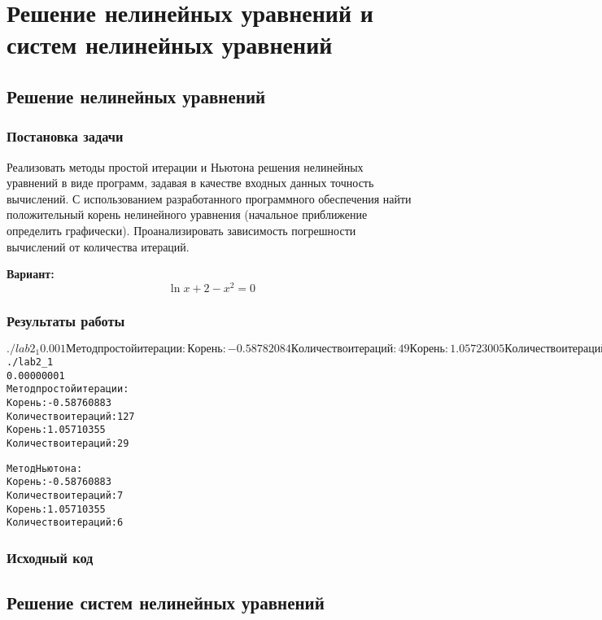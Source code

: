 \section{Решение нелинейных уравнений и систем нелинейных уравнений}

\subsection{Решение нелинейных уравнений}

\subsubsection{Постановка задачи}
Реализовать методы простой итерации и Ньютона решения нелинейных уравнений в виде программ, задавая в качестве входных данных точность вычислений. С использованием разработанного программного обеспечения найти положительный корень нелинейного уравнения (начальное приближение определить графически). Проанализировать зависимость погрешности вычислений от количества итераций.

{\bfseries Вариант:}
\begin{equation*}
\ln{x+2} - x^2 = 0
\end{equation*}

\subsubsection{Результаты работы}
\begin{alltt}
$ ./lab2_1
0.001
Метод простой итерации:
Корень: -0.58782084
Количество итераций: 49
Корень: 1.05723005
Количество итераций: 11

Метод Ньютона:
Корень: -0.58760883
Количество итераций: 6
Корень: 1.05710366
Количество итераций: 4

$ ./lab2_1
0.00000001
Метод простой итерации:
Корень: -0.58760883
Количество итераций: 127
Корень: 1.05710355
Количество итераций: 29

Метод Ньютона:
Корень: -0.58760883
Количество итераций: 7
Корень: 1.05710355
Количество итераций: 6
\end{alltt}

\subsubsection{Исходный код}

\pagebreak

\subsection{Решение систем нелинейных уравнений}


